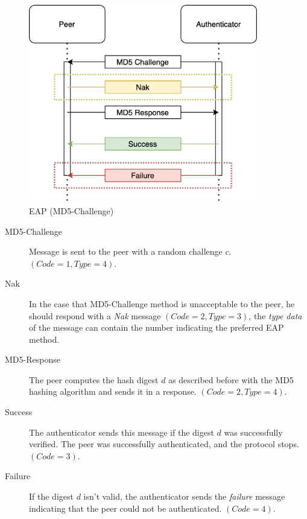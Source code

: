 \begin{figure}[h]
	\centering
	\includegraphics[width=10cm]{images/eap-md5-2}
	\caption{EAP (MD5-Challenge)}
	\label{fig:eap-md5}
\end{figure}

\begin{description}
	\item [MD5-Challenge] Message is sent to the peer with a random challenge $c$. $(Code=1, Type=4)$.
	\item [Nak] In the case that MD5-Challenge method is unacceptable to the peer, he should respond with a \textit{Nak} message $(Code=2, Type=3)$, the \textit{type data} of the message can contain the number indicating the preferred EAP method.
	\item [MD5-Response] The peer computes the hash digest $d$ as described before with the MD5 hashing algorithm and sends it in a response. $(Code=2, Type=4)$.
	\item [Success] The authenticator sends this message if the digest $d$ was successfully verified. The peer was successfully authenticated, and the protocol stops. $(Code=3)$.
	\item [Failure] If the digest $d$ isn't valid, the authenticator sends the \textit{failure} message indicating that the peer could not be authenticated. $(Code=4)$.
\end{description}



































